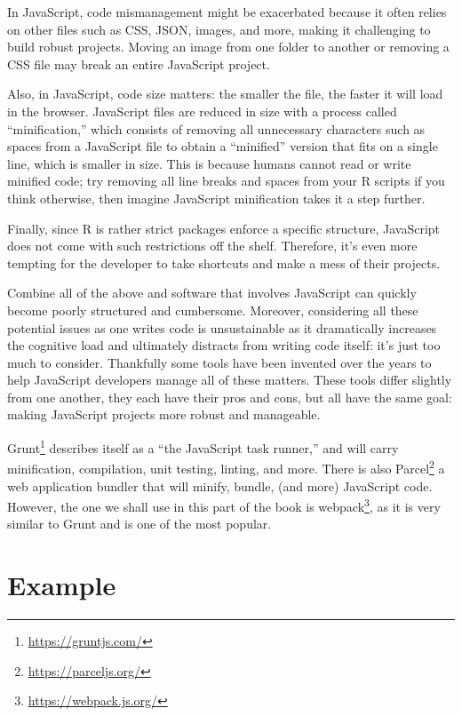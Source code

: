 \documentclass[
]{krantz}
\renewcommand{\href}[2]{#2\footnote{\url{#1}}}
\begin{document}
In JavaScript, code mismanagement might be exacerbated because it often relies on other files such as CSS, JSON, images, and more, making it challenging to build robust projects. Moving an image from one folder to another or removing a CSS file may break an entire JavaScript project.

Also, in JavaScript, code size matters: the smaller the file, the faster it will load in the browser. JavaScript files are reduced in size with a process called ``minification,'' which consists of removing all unnecessary characters such as spaces from a JavaScript file to obtain a ``minified'' version that fits on a single line, which is smaller in size. This is because humans cannot read or write minified code; try removing all line breaks and spaces from your R scripts if you think otherwise, then imagine JavaScript minification takes it a step further.

Finally, since R is rather strict packages enforce a specific structure, JavaScript does not come with such restrictions off the shelf. Therefore, it's even more tempting for the developer to take shortcuts and make a mess of their projects.

Combine all of the above and software that involves JavaScript can quickly become poorly structured and cumbersome. Moreover, considering all these potential issues as one writes code is unsustainable as it dramatically increases the cognitive load and ultimately distracts from writing code itself: it's just too much to consider. Thankfully some tools have been invented over the years to help JavaScript developers manage all of these matters. These tools differ slightly from one another, they each have their pros and cons, but all have the same goal: making JavaScript projects more robust and manageable.

\href{https://gruntjs.com/}{Grunt} describes itself as a ``the JavaScript task runner,'' and will carry minification, compilation, unit testing, linting, and more. There is also \href{https://parceljs.org/}{Parcel} a web application bundler that will minify, bundle, (and more) JavaScript code. However, the one we shall use in this part of the book is \href{https://webpack.js.org/}{webpack}, as it is very similar to Grunt and is one of the most popular.

\hypertarget{webpack-example}{%
\section{Example}\label{webpack-example}}
\end{document}

